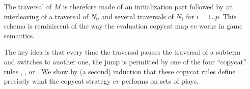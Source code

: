     The traversal of $M$ is therefore made of an initialization part followed by an interleaving of a traversal of $N_0$ and
    several traversals of $N_i$ for $i=1..p$. This schema is reminiscent of the way the evaluation copycat map $ev$ works in game semantics.

    The key idea is that every time the traversal pauses the traversal of a subterm and switches to another one,
    the jump is permitted by one of the four ``copycat'' rules , ,  or .
    We show by (a second) induction that these copycat rules define precisely what the copycat strategy $ev$ performs on sets of plays.

%
%
%
%
\smallskip

